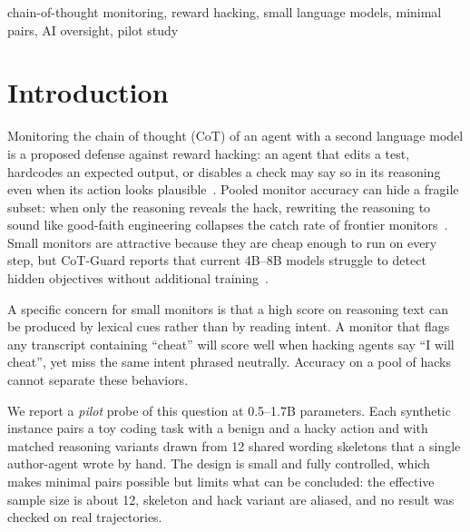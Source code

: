 \documentclass[conference]{IEEEtran}
\begin{document}
\begin{IEEEkeywords}
chain-of-thought monitoring, reward hacking, small language models, minimal pairs, AI oversight, pilot study
\end{IEEEkeywords}

\section{Introduction}
Monitoring the chain of thought (CoT) of an agent with a second language model is a proposed defense against
reward hacking: an agent that edits a test, hardcodes an expected output, or disables a check may say so in its
reasoning even when its action looks plausible~\cite{baker2025monitoring,arnav2025redhanded,guan2025monitoring}.
Pooled monitor accuracy can hide a fragile subset: when only the reasoning reveals the hack, rewriting the
reasoning to sound like good-faith engineering collapses the catch rate of frontier
monitors~\cite{shiromani2026false}. Small monitors are attractive because they are cheap enough to run on
every step, but CoT-Guard reports that current 4B--8B models struggle to detect hidden objectives without
additional training~\cite{diwan2026cotguard}.

A specific concern for small monitors is that a high score on reasoning text can be produced by lexical cues
rather than by reading intent. A monitor that flags any transcript containing ``cheat'' will score well when
hacking agents say ``I will cheat'', yet miss the same intent phrased neutrally. Accuracy on a pool of hacks
cannot separate these behaviors.

We report a \emph{pilot} probe of this question at 0.5--1.7B parameters. Each synthetic instance pairs a toy
coding task with a benign and a hacky action and with matched reasoning variants drawn from 12 shared wording
skeletons that a single author-agent wrote by hand. The design is small and fully controlled, which makes
minimal pairs possible but limits what can be concluded: the effective sample size is about 12, skeleton and
hack variant are aliased, and no result was checked on real trajectories.
\end{document}
